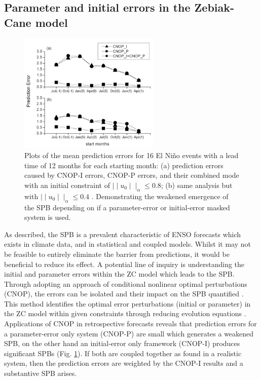 \documentclass[12pt, onecolumn]{revtex4}    %
\begin{document}
\subsection{Parameter and initial errors in the Zebiak-Cane model}
\begin{figure}
\includegraphics[width=0.6\textwidth]{data/cnop}
\caption[CNOP]{Plots of the mean prediction errors for 16 El Ni\~{n}o events with a lead time of 12 months for each starting month: (a) prediction errors caused by CNOP-I errors, CNOP-P errors, and their combined mode with an initial constraint of $\mid \mid u_0 \mid \mid _\alpha \leq 0.8$; (b) same analysis but with $\mid \mid u_0 \mid \mid _\alpha \leq 0.4$ \citep{yu2012does}. Demonstrating the weakened emergence of the SPB depending on if a parameter-error or initial-error masked system is used.}
\label{fig:cnop}
\end{figure}

\noindent
As described, the SPB is a prevalent characteristic of ENSO forecasts which exists in climate data, and in statistical and coupled models. Whilst it may not be feasible to entirely eliminate the barrier from predictions, it would be beneficial to reduce its effect. A potential line of inquiry is understanding the initial and parameter errors within the ZC model which leads to the SPB. Through adopting an approach of conditional nonlinear optimal perturbations (CNOP), the errors can be isolated and their impact on the SPB quantified \citep{duan2009exploring}. This method identifies the optimal error perturbations (initial or parameter) in the ZC model within given constraints through reducing evolution equations \citep{mu2010extension}. Applications of CNOP in retrospective forecasts reveals that prediction errors for a parameter-error only system (CNOP-P) are small which generates a weakened SPB, on the other hand an initial-error only framework (CNOP-I) produces significant SPBs (Fig. \ref{fig:cnop}). If both are coupled together as found in a realistic system, then the prediction errors are weighted by the CNOP-I results and a substantive SPB arises. \\
\end{document}
